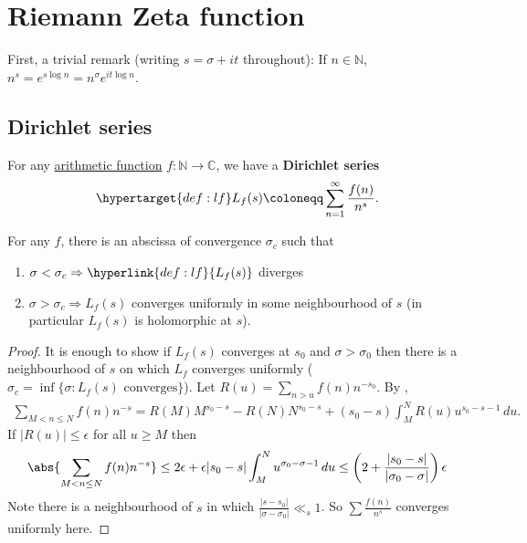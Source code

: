 \documentclass{article}
\newcommand{\1}{\mathbbm{1}}
\newcommand{\named}[1]{\textbf{#1}\index{#1}}
\begin{document}
\clearpage
\section{Riemann Zeta function}
\newlec
First, a trivial remark (writing $s = \sigma + it$ throughout):
If $n \in \mathbb{N}$, $n^s = e^{s \log n} = n^\sigma e^{it \log n}$.

\subsection{Dirichlet series}
For any \hyperlink{def:arith}{arithmetic function} $f: \mathbb{N} \to \mathbb{C}$, we have a \textbf{Dirichlet series}
\begin{align*}
  \hypertarget{def:lf}L_f(s) \coloneqq \sum_{n=1}^\infty \frac{f(n)}{n^s}.
\end{align*}
\begin{nlemma}
  For any $f$, there is an abscissa of convergence $\sigma_c$ such that
  \begin{enumerate}[label=(\arabic*)]
    \item $\sigma < \sigma_c \Rightarrow \hyperlink{def:lf}{L_f(s)}$ diverges
    \item $\sigma > \sigma_c \Rightarrow L_f(s)$ converges uniformly in some neighbourhood of $s$ (in particular $L_f(s)$ is holomorphic at $s$).
  \end{enumerate}
\end{nlemma}
\begin{proof}
  It is enough to show if \hyperlink{def:lf}{$L_f(s)$} converges at $s_0$ and $\sigma > \sigma_0$ then there is a neighbourhood of $s$ on which $L_f$ converges uniformly ($\sigma_c = \inf\{\sigma : L_f(s) \text{ converges}\}$).
  Let $R(u) = \sum_{n > u} f(n) n^{-s_0}$.
  By ,
  \begin{align*}
    \sum_{M < n \leq N} f(n) n^{-s} = R(M) M^{s_0 - s} - R(N) N^{s_0 - s} + (s_0 - s) \int_M^N R(u) u^{s_0 - s - 1} \, du.
  \end{align*}
  If $|R(u)| \leq \epsilon$ for all $u \geq M$ then
  \begin{align*}
    \abs{\sum_{M < n \leq N} f(n) n^{-s}} \leq 2\epsilon + \epsilon |s_0 - s| \int_M^N u^{\sigma_0 - \sigma - 1} \, du \leq \left(2 + \frac{|s_0 - s|}{|\sigma_0 - \sigma|}\right) \epsilon
  \end{align*}
  Note there is a neighbourhood of $s$ in which $\frac{|s-s_0|}{|\sigma-\sigma_0|} \ll_s 1$. So $\sum \frac{f(n)}{n^{s}}$ converges uniformly here.
\end{proof}
\end{document}
